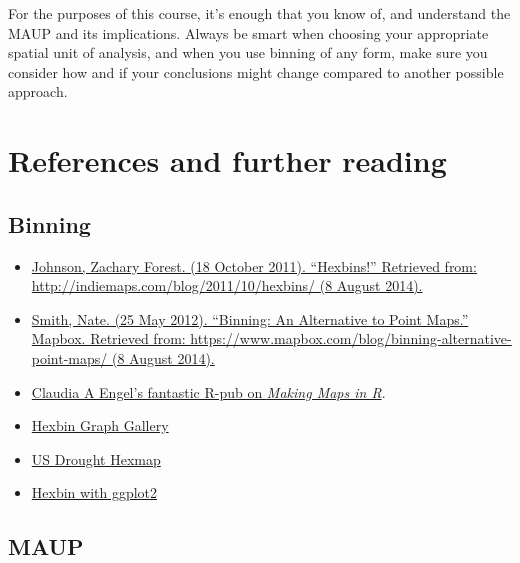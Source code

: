 \documentclass[
]{book}
\providecommand{\tightlist}{%
  \setlength{\itemsep}{0pt}\setlength{\parskip}{0pt}}
\begin{document}
For the purposes of this course, it's enough that you know of, and understand the MAUP and its implications. Always be smart when choosing your appropriate spatial unit of analysis, and when you use binning of any form, make sure you consider how and if your conclusions might change compared to another possible approach.

\hypertarget{references-and-further-reading}{%
\section{References and further reading}\label{references-and-further-reading}}

\hypertarget{binning}{%
\subsection{Binning}\label{binning}}

\begin{itemize}
\tightlist
\item
  \href{http://indiemaps.com/blog/2011/10/hexbins/}{Johnson, Zachary Forest. (18 October 2011). ``Hexbins!'' Retrieved from: http://indiemaps.com/blog/2011/10/hexbins/ (8 August 2014).}
\item
  \href{https://www.mapbox.com/blog/binning-alternative-point-maps/}{Smith, Nate. (25 May 2012). ``Binning: An Alternative to Point Maps.'' Mapbox. Retrieved from: https://www.mapbox.com/blog/binning-alternative-point-maps/ (8 August 2014).}
\item
  \href{http://www.rpubs.com/cengel248/97543}{Claudia A Engel's fantastic R-pub on \emph{Making Maps in R}}.
\item
  \href{https://www.r-graph-gallery.com/329-hexbin-map-for-distribution/}{Hexbin Graph Gallery}
\item
  \href{https://www.r-bloggers.com/u-s-drought-monitoring-with-hexbin-state-maps-in-r/}{US Drought Hexmap}
\item
  \href{http://santiago.begueria.es/2016/04/mapping-with-ggplot2-hexbin-maps/}{Hexbin with ggplot2}
\end{itemize}

\hypertarget{maup}{%
\subsection{MAUP}\label{maup}}
\end{document}
